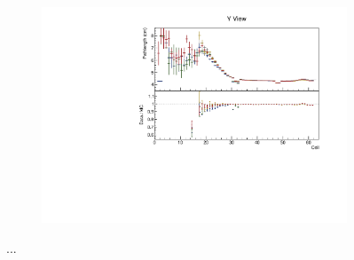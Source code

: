 \documentclass[12pt,a4paper]{article}
\begin{document}
\begin{figure}[!ht]
\begin{subfigure}{0.5\textwidth}
  \end{subfigure}
  \begin{subfigure}{0.5\textwidth}
    \includegraphics[width=\linewidth]{essentialsec_tb/cm_cell_y.pdf}
  \end{subfigure}
  \caption{...}
  \label{figAbsCalibCell2}
\end{figure}
\end{document}
